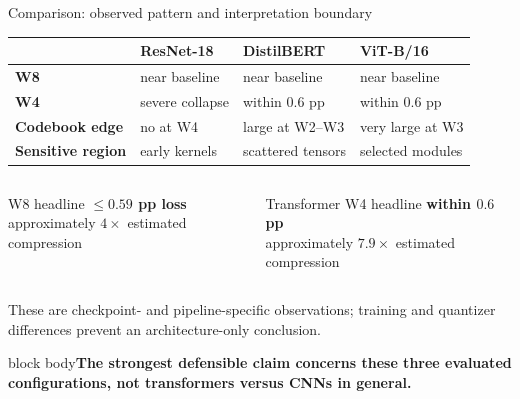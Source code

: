 \documentclass[aspectratio=169,10pt]{beamer}
\newcommand{\takeaway}[1]{\vfill\begin{beamercolorbox}[wd=\textwidth,sep=1.5mm,rounded=true]{block body}\centering\small\bfseries #1\end{beamercolorbox}}
\begin{document}
\begin{frame}{Comparison: observed pattern and interpretation boundary}
\small
\begin{tabular}{>{\bfseries}m{26mm} m{31mm} m{31mm} m{31mm}}
\toprule
 & ResNet-18 & DistilBERT & ViT-B/16\\
\midrule
W8 & near baseline & near baseline & near baseline\\
W4 & severe collapse & within 0.6 pp & within 0.6 pp\\
Codebook edge & no at W4 & large at W2--W3 & very large at W3\\
Sensitive region & early kernels & scattered tensors & selected modules\\
\bottomrule
\end{tabular}
\vspace{3mm}
\begin{columns}[T,onlytextwidth]
\begin{block}{W8 headline}\centering
\normalsize\textbf{$\leq0.59$ pp loss}\\[-1mm]
\small approximately $4\times$ estimated compression
\end{block}
\begin{block}{Transformer W4 headline}\centering
\normalsize\textbf{within $0.6$ pp}\\[-1mm]
\small approximately $7.9\times$ estimated compression
\end{block}
\end{columns}
\vspace{1mm}
\begin{center}\scriptsize These are checkpoint- and pipeline-specific observations; training and quantizer differences prevent an architecture-only conclusion.\end{center}
\takeaway{The strongest defensible claim concerns these three evaluated configurations, not transformers versus CNNs in general.}
\end{frame}
\end{document}
